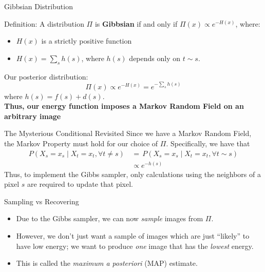 \documentclass[10pt]{beamer}
\begin{document}
\begin{frame}{Gibbsian Distribution}
\begin{block}{Definition:}
A distribution $\Pi$ is \textbf{Gibbsian} if and only if $\Pi(x) \propto e^{-H(x)}$, where:
\begin{itemize}
\item $H(x)$ is a strictly positive function \\[1.5ex]
\item $H(x) = \sum\limits_s h(s)$, where $h(s)$ depends only on $t\sim s$.
\end{itemize}
\end{block}

\pause
Our posterior distribution: 
\[ \Pi(x) \propto e^{-H(x)} = e^{-\sum\limits_s h(s)} \]
where $h(s) = f(s) + d(s)$.\\[2ex]
\textbf{Thus, our energy function imposes a Markov Random Field on an arbitrary image}%


\end{frame}

\begin{frame}{The Mysterious Conditional Revisited}
Since we have a Markov Random Field, the Markov Property must hold for our choice of $\Pi$.
Specifically, we have that
\begin{align*}
P(X_s = x_s \mid X_t = x_t, \forall t \neq s) \,&=\, P(X_s = x_s \mid X_t = x_t, \forall t \sim s) 
\\ &\propto e^{-h(s)}
\end{align*}
Thus, to implement the Gibbs sampler, only calculations using the neighbors of a pixel $s$ are required to update that pixel.
\end{frame}

\begin{frame}{Sampling vs Recovering}
\begin{itemize}
\item Due to the Gibbs sampler, we can now \textit{sample} images from $\Pi$.
\item However, we don't just want a sample of images which are just ``likely'' to have low energy; we want to produce \textit{one} image that has the \textit{lowest} energy.
\item This is called the \textit{maximum a posteriori} (MAP) estimate.
\end{itemize}
\end{frame}
\end{document}
